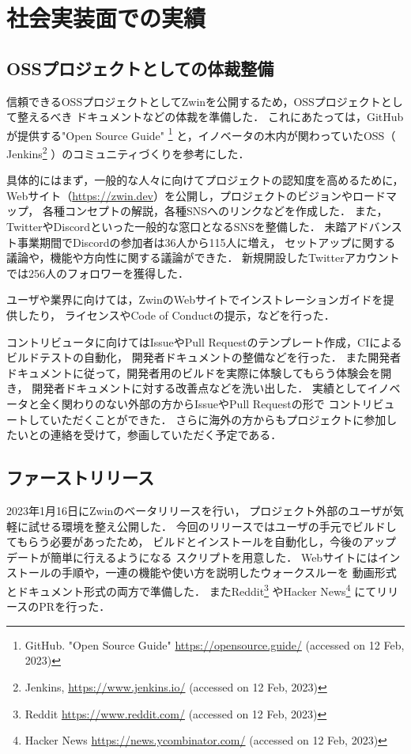 \section{社会実装面での実績}

\subsection{OSSプロジェクトとしての体裁整備}

信頼できるOSSプロジェクトとしてZwinを公開するため，OSSプロジェクトとして整えるべき
ドキュメントなどの体裁を準備した．
これにあたっては，GitHubが提供する"Open Source Guide"
\footnote{GitHub. "Open Source Guide" \url{https://opensource.guide/} (accessed on 12 Feb, 2023)}
と，イノベータの木内が関わっていたOSS（
Jenkins\footnote{Jenkins, \url{https://www.jenkins.io/} (accessed on 12 Feb, 2023)}
）のコミュニティづくりを参考にした．

具体的にはまず，一般的な人々に向けてプロジェクトの認知度を高めるために，
Webサイト（\url{https://zwin.dev}）を公開し，プロジェクトのビジョンやロードマップ，
各種コンセプトの解説，各種SNSへのリンクなどを作成した．
また，TwitterやDiscordといった一般的な窓口となるSNSを整備した．
未踏アドバンスト事業期間でDiscordの参加者は36人から115人に増え，
セットアップに関する議論や，機能や方向性に関する議論ができた．
新規開設したTwitterアカウントでは256人のフォロワーを獲得した．

ユーザや業界に向けては，ZwinのWebサイトでインストレーションガイドを提供したり，
ライセンスやCode of Conductの提示，などを行った．

コントリビュータに向けてはIssueやPull Requestのテンプレート作成，CIによるビルドテストの自動化，
開発者ドキュメントの整備などを行った．
また開発者ドキュメントに従って，開発者用のビルドを実際に体験してもらう体験会を開き，
開発者ドキュメントに対する改善点などを洗い出した．
実績としてイノベータと全く関わりのない外部の方からIssueやPull Requestの形で
コントリビュートしていただくことができた．
さらに海外の方からもプロジェクトに参加したいとの連絡を受けて，参画していただく予定である．


\subsection{ファーストリリース}

2023年1月16日にZwinのベータリリースを行い，
プロジェクト外部のユーザが気軽に試せる環境を整え公開した．
今回のリリースではユーザの手元でビルドしてもらう必要があったため，
ビルドとインストールを自動化し，今後のアップデートが簡単に行えるようになる
スクリプトを用意した．
Webサイトにはインストールの手順や，一連の機能や使い方を説明したウォークスルーを
動画形式とドキュメント形式の両方で準備した．
またReddit\footnote{Reddit \url{https://www.reddit.com/} (accessed on 12 Feb, 2023)}
やHacker News\footnote{Hacker News \url{https://news.ycombinator.com/} (accessed on 12 Feb, 2023)}
にてリリースのPRを行った．

